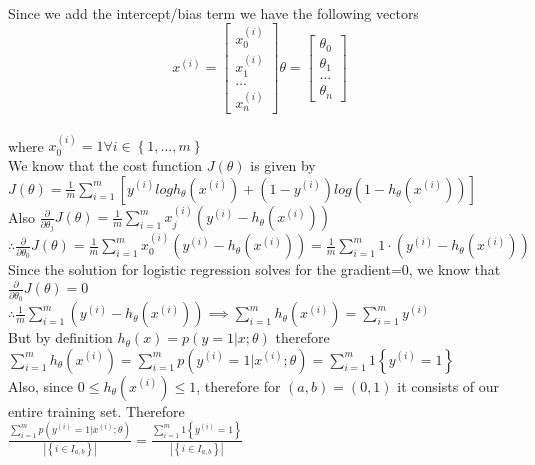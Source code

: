 \begin{answer}\\
Since we add the intercept/bias term we have the following vectors\\
\[
x^{(i)}=
\begin{bmatrix}
    x_{0}^{(i)}\\
    x_{1}^{(i)}\\
    \dots\\
    x_{n}^{(i)}
\end{bmatrix} \theta=
 \begin{bmatrix}
    \theta_{0}\\
    \theta_{1}\\
    \dots\\
    \theta_{n}
\end{bmatrix}
\]\\
where $x_0^{(i)}=1 \forall i \in \left\lbrace 1, \dots ,m \right\rbrace $\\
We know that the cost function $J(\theta)$ is given by\\
$J(\theta)=\frac{1}{m}\sum_{i=1}^{m}[y^{(i)}logh_{\theta}(x^{(i)})+(1-y^{(i)})log(1-h_{\theta}(x^{(i)}))]$\\
Also $\frac{\partial}{\partial \theta_j}J(\theta)=\frac{1}{m}\sum_{i=1}^{m}x_j^{(i)}(y^{(i)}-h_{\theta}(x^{(i)}))$\\
$\therefore \frac{\partial}{\partial \theta_0}J(\theta)=\frac{1}{m}\sum_{i=1}^{m}x_0^{(i)}(y^{(i)}-h_{\theta}(x^{(i)}))=\frac{1}{m}\sum_{i=1}^{m}1 \cdot (y^{(i)}-h_{\theta}(x^{(i)}))$\\
Since the solution for logistic regression solves for the gradient=0, we know that $\frac{\partial}{\partial \theta_0}J(\theta)=0$\\
$\therefore \frac{1}{m}\sum_{i=1}^{m}(y^{(i)}-h_{\theta}(x^{(i)})) \implies \sum_{i=1}^{m}h_{\theta}(x^{(i)})=\sum_{i=1}^{m}y^{(i)}$\\
But by definition $h_{\theta}(x)=p(y=1|x;\theta)$ therefore $\sum_{i=1}^{m}h_{\theta}(x^{(i)})=\sum_{i=1}^{m}p(y^{(i)}=1|x^{(i)};\theta)=\sum_{i=1}^{m}1\left\lbrace y^{(i)}=1 \right\rbrace$\\
Also, since $0 \leq h_{\theta}(x^{(i)}) \leq 1$, therefore for $(a,b)=(0,1)$ it consists of our entire training set. Therefore\\
$\frac{\sum_{i=1}^{m}p(y^{(i)}=1|x^{(i)};\theta)}{|\left\lbrace i \in I_{a,b}\right\rbrace|}=\frac{\sum_{i=1}^{m}1 \left\lbrace y^{(i)}=1\right\rbrace}{|\left\lbrace i \in I_{a,b}\right\rbrace|}$\\
\end{answer}
